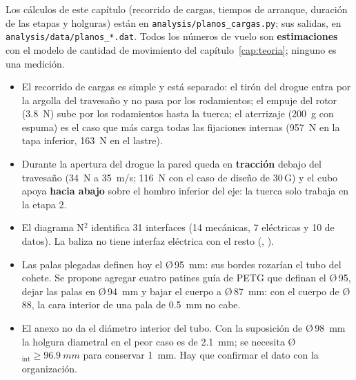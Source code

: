 Los cálculos de este capítulo (recorrido de cargas, tiempos de arranque, duración de las
etapas y holguras) están en \texttt{analysis/planos\_cargas.py}; sus salidas, en \texttt{analysis/data/planos\_*.dat}.
Todos los números de vuelo son \textbf{estimaciones} con el modelo de cantidad de
movimiento del capítulo~\ref{cap:teoria}; ninguno es una medición.

\begin{resultado}
\begin{itemize}[leftmargin=*]
  \item El recorrido de cargas es simple y está separado: el tirón del drogue entra por la
        argolla del travesaño y no pasa por los rodamientos; el empuje del rotor
        (\SI{3.8}{N}) sube por los rodamientos hasta la tuerca; el aterrizaje
        (\SI{200}{g} con espuma) es el caso que más carga todas las fijaciones internas
        (\SI{957}{N} en la tapa inferior, \SI{163}{N} en el lastre).
  \item Durante la apertura del drogue la pared queda en \textbf{tracción} debajo del
        travesaño (\SI{34}{N} a \SI{35}{m/s}; \SI{116}{N} con el caso de diseño de 30\,G) y
        el cubo apoya \textbf{hacia abajo} sobre el hombro inferior del eje: la tuerca solo
        trabaja en la etapa 2.
  \item El diagrama N$^2$ identifica 31 interfaces (14 mecánicas, 7 eléctricas y 10 de
        datos). La baliza no tiene interfaz eléctrica con el resto (, ).
  \item Las palas plegadas definen hoy el Ø\,\SI{95}{mm}: sus bordes rozarían el tubo del
        cohete. Se propone agregar cuatro patines guía de PETG que definan el Ø\,95, dejar
        las palas en Ø\,\SI{94}{mm} y bajar el cuerpo a Ø\,\SI{87}{mm}: con el cuerpo de
        Ø\,88, la cara interior de una pala de \SI{0.5}{mm} no cabe.
  \item El anexo no da el diámetro interior del tubo. Con la suposición de
        Ø\,\SI{98}{mm} la holgura diametral en el peor caso es de \SI{2.1}{mm}; se
        necesita Ø$_\text{int}\ge\SI{96.9}{mm}$ para conservar \SI{1}{mm}. Hay que
        confirmar el dato con la organización.
\end{itemize}
\end{resultado}

